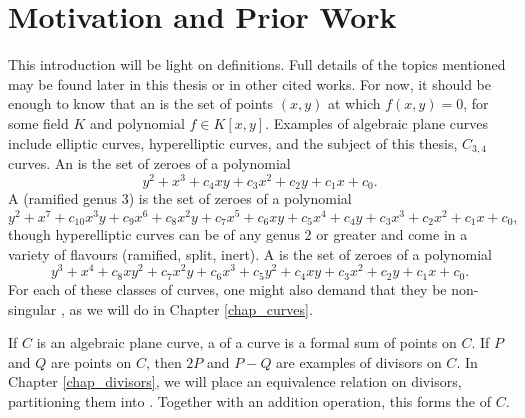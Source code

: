 

\section{Motivation and Prior Work}

This introduction will be light on definitions.
Full details of the topics mentioned may be found later in this thesis or in other cited works.
For now, it should be enough to know that an  is the set of points $(x,y)$
at which $f(x, y) = 0$, for some field $K$ and polynomial $f \in K[x,y]$.
Examples of algebraic plane curves include elliptic curves, hyperelliptic curves,
and the subject of this thesis, $C_{3,4}$ curves.
An  is the set of zeroes of a polynomial
\begin{equation}
  \label{eq_elliptic}
  y^2 + x^3 + c_4xy + c_3x^2 + c_2y + c_1x + c_0.
\end{equation}
A (ramified genus 3)  is the set of zeroes of a polynomial
\begin{equation}
  \label{eq_genus_3_hyperelliptic}
  y^2 + x^7 + c_{10}x^3y + c_9x^6 + c_8x^2y + c_7x^5 + c_6xy + c_5x^4 + c_4y + c_3x^3 + c_2x^2 + c_1x + c_0,
\end{equation}
though hyperelliptic curves can be of any genus 2 or greater and come in a variety of flavours (ramified, split, inert).
A  is the set of zeroes of a polynomial
\begin{equation}
  \label{eq_c34_intro}
  y^3 + x^4 + c_8xy^2 + c_7x^2y + c_6x^3 + c_5y^2 + c_4xy + c_3x^2 + c_2y + c_1x + c_0.
\end{equation}
For each of these classes of curves, one might also demand that they be non-singular
,
as we will do in Chapter \ref{chap_curves}.

If $C$ is an algebraic plane curve, a  of a curve is a formal sum of points on $C$.
If $P$ and $Q$ are points on $C$, then $2P$ and $P - Q$ are examples of divisors on $C$.
In Chapter \ref{chap_divisors}, we will place an equivalence relation on divisors,
partitioning them into .
Together with an addition operation, this forms the  of $C$.




